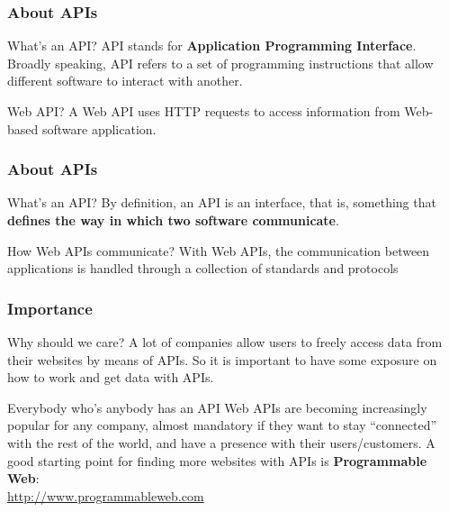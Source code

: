 \documentclass{beamer}\usepackage[]{graphicx}\usepackage[]{color}
\begin{document}

\begin{frame}
\frametitle{About APIs}

\begin{block}{What's an API?}
API stands for \textbf{Application Programming Interface}. Broadly speaking, API refers to a set of programming instructions that allow different software to interact with another. 
\end{block}

\begin{block}{Web API?}
A Web API uses HTTP requests to access information from Web-based software application.
\end{block}

\end{frame}


\begin{frame}
\frametitle{About APIs}

\begin{block}{What's an API?}
By definition, an API is an interface, that is, something that \textbf{defines the way in which two software communicate}.
\end{block}

\begin{block}{How Web APIs communicate?}
With Web APIs, the communication between applications is handled through a collection of standards and protocols 
\end{block}

\end{frame}


\begin{frame}
\frametitle{Importance}

\begin{block}{Why should we care?}
A lot of companies allow users to freely access data from their websites by means of APIs. So it is important to have some exposure on how to work and get data with APIs.
\end{block}

\begin{block}{Everybody who's anybody has an API}
Web APIs are becoming increasingly popular for any company, almost mandatory if they want to stay ``connected'' with the rest of the world, and have a presence with their users/customers. A good starting point for finding more websites with APIs is \textbf{Programmable Web}: \\
{\footnotesize \url{http://www.programmableweb.com}}
\end{block}

\end{frame}
\end{document}
